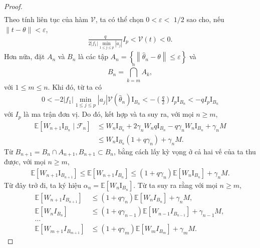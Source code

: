 \begin{proof}
\begin{align}
\label{8.8.1}
\end{align}
Theo tính liên tục của hàm $\mathcal{V}$, ta có thể chọn $0<\varepsilon<$ $1 / 2$ sao cho, nếu $\|t-\theta\|<\varepsilon$,
\begin{align}
    \frac{q}{2\left|f_{1}\right| \min _{1 \leq j \leq p}\left|a_{j}\right|} I_{p}<\mathcal{V}(t)<0.
    \label{8.9}
\end{align}
Hơn nữa, đặt $A_{n}$ và $B_{n}$ là các tập $A_{n}=\left\{\left\|\widehat{\theta}_{n}-\theta\right\| \leq \varepsilon\right\}$ và
$$
B_{n}=\bigcap_{k=m}^{n} A_{k},
$$
với $1 \leq m \leq n$. Khi đó, từ  ta có
\begin{align}
0<-2\left|f_{1}\right| \min _{1 \leq j \leq p}\left|a_{j}\right| \mathcal{V}\left(\widehat{\theta}_{n}\right) \mathrm{I}_{B_{n}}<-\left(\frac{q}{2}\right) I_{p} \mathrm{I}_{B_{n}} <-q I_{p} \mathrm{I}_{B_{n}}
\label{8.10}
\end{align}
với $I_{p}$ là ma trận đơn vị. Do đó, kết hợp  và  ta suy ra, với mọi $n \geq m$,
\begin{align}
\mathbb{E}\left[W_{n+1} \mathrm{I}_{B_{n}} \mid \mathcal{F}_{n}\right] & \leq W_{n} \mathrm{I}_{B_{n}}+2 \gamma_{n} W_{n} q \mathrm{I}_{B_{n}}-q \gamma_{n} W_{n} \mathrm{I}_{B_{n}}+\gamma_{n} M \\
& \leq W_{n} \mathrm{I}_{B_{n}}\left(1+q \gamma_{n}\right)+\gamma_{n} M\text{.}
\label{8.11}
\end{align}
Từ $B_{n+1}=B_{n} \cap A_{n+1}, B_{n+1} \subset B_{n}$, bằng cách lấy kỳ vọng ở cả hai vế của  ta thu được, với mọi $n \geq m$,
\begin{align}
\mathbb{E}\left[W_{n+1} \mathrm{I}_{B_{n+1}}\right] \leq \mathbb{E}\left[W_{n+1} I_{B_n}\right] \leq\left(1+q \gamma_{n}\right) \mathbb{E}\left[W_{n} \mathrm{I}_{B_{n}}\right]+\gamma_{n} M.
\label{8.12}
\end{align}
Từ đây trở đi, ta ký hiệu $\alpha_{n}=\mathbb{E}\left[W_{n} \mathrm{I}_{B_{n}}\right]$. Từ   ta suy ra rằng với mọi $n \geq m$,
$$
\begin{aligned}
\mathbb{E}\left[W_{n+1} I_{B_{n+1}}\right] &\leqslant\left(1+q \gamma_n\right) \mathbb{E}\left[W_n I_{B_n}\right]+\gamma_n M \text {, } \\ 
\mathbb{E}\left[W_n I_{B_n}\right] &\leqslant\left(1+q \gamma_{n-1}\right) \mathbb{E}\left[W_{n-1} I_{B_{n-1}}\right]+\gamma_{n-1} M \text {, } \\
\dots \\
\mathbb{E}\left[W_{m+1} I_{B_{m+1}}\right] &\leqslant\left(1+q \gamma_m\right) \mathbb{E}\left[W_m I_{B_m}\right]+\gamma_m M.

\end{aligned}$$
\end{proof}
